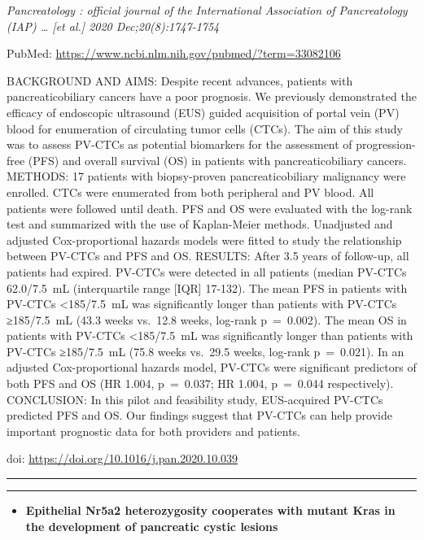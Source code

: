 \documentclass[
]{article}
\providecommand{\tightlist}{%
  \setlength{\itemsep}{0pt}\setlength{\parskip}{0pt}}
\begin{document}
\emph{Pancreatology : official journal of the International Association
of Pancreatology (IAP) \ldots{} {[}et al.{]} 2020 Dec;20(8):1747-1754}

PubMed: \url{https://www.ncbi.nlm.nih.gov/pubmed/?term=33082106}

BACKGROUND AND AIMS: Despite recent advances, patients with
pancreaticobiliary cancers have a poor prognosis. We previously
demonstrated the efficacy of endoscopic ultrasound (EUS) guided
acquisition of portal vein (PV) blood for enumeration of circulating
tumor cells (CTCs). The aim of this study was to assess PV-CTCs as
potential biomarkers for the assessment of progression-free (PFS) and
overall survival (OS) in patients with pancreaticobiliary cancers.
METHODS: 17 patients with biopsy-proven pancreaticobiliary malignancy
were enrolled. CTCs were enumerated from both peripheral and PV blood.
All patients were followed until death. PFS and OS were evaluated with
the log-rank test and summarized with the use of Kaplan-Meier methods.
Unadjusted and adjusted Cox-proportional hazards models were fitted to
study the relationship between PV-CTCs and PFS and OS. RESULTS: After
3.5 years of follow-up, all patients had expired. PV-CTCs were detected
in all patients (median PV-CTCs 62.0/7.5~mL (interquartile range
{[}IQR{]} 17-132). The mean PFS in patients with PV-CTCs
\textless185/7.5~mL was significantly longer than patients with PV-CTCs
≥185/7.5~mL (43.3 weeks vs.~12.8 weeks, log-rank p~=~0.002). The mean OS
in patients with PV-CTCs \textless185/7.5~mL was significantly longer
than patients with PV-CTCs ≥185/7.5~mL (75.8 weeks vs.~29.5 weeks,
log-rank p~=~0.021). In an adjusted Cox-proportional hazards model,
PV-CTCs were significant predictors of both PFS and OS (HR 1.004,
p~=~0.037; HR 1.004, p~=~0.044 respectively). CONCLUSION: In this pilot
and feasibility study, EUS-acquired PV-CTCs predicted PFS and OS. Our
findings suggest that PV-CTCs can help provide important prognostic data
for both providers and patients.

doi: \url{https://doi.org/10.1016/j.pan.2020.10.039}

\begin{center}\rule{0.5\linewidth}{0.5pt}\end{center}

\begin{center}\rule{0.5\linewidth}{0.5pt}\end{center}

\begin{itemize}
\tightlist
\item
  \textbf{Epithelial Nr5a2 heterozygosity cooperates with mutant Kras in
  the development of pancreatic cystic lesions}
\end{itemize}
\end{document}
